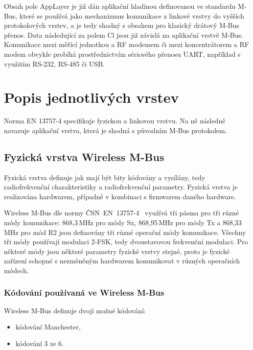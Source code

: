Obsah pole AppLayer je již dán aplikační hladinou definovanou ve standardu M-Bus, které se používá jako mechanizmus komunikace z linkové vrstvy do vyšších protokolových vrstev, a je tedy shodný s obsahem pro klasický drátový M-Bus přenos.  Data následující za polem Cl jsou již závislá na aplikační vrstvě M-Bus. Komunikace mezi měřící jednotkou a RF modemem či mezi koncentrátorem a RF modem obvykle probíhá prostřednictvím sériového přenosu UART, například s využitím RS-232, RS-485 či USB.





\section{Popis jednotlivých vrstev}

Norma EN 13757-4 specifikuje fyzickou a linkovou vrstvu. Na ně následně navazuje aplikační vrstva, která je shodná s původním M-Bus protokolem.

\subsection{Fyzická vrstva Wireless M-Bus}
Fyzická vrstva definuje jak mají být bity kódovány a vysílány, tedy radiofrekvenční charakteristiky a radiofrekvenční parametry. Fyzická vrstva je realizována hardwarem, případně v kombinaci s firmwarem daného hardware.

Wireless M-Bus dle normy ČSN~EN~13757-4~\cite{Norma4} využívá tři pásma pro tři různé módy komunikace: 868,3\,MHz pro módy Sx, 868,95\,MHz pro módy Tx a 868,33\,MHz pro mód R2 jsou definovány tři různé operační módy komunikace. Všechny tři módy používají modulaci 2-FSK, tedy dvoustavovou frekvenční modulaci. Pro některé módy jsou některé parametry fyzické vrstvy stejné, proto je fyzické zařízení schopné s nezměněným hardwarem komunikovat v různých operačních módech.


\subsubsection{Kódování používaná ve Wireless M-Bus}
Wireless M-Bus definuje dvojí možné kódování: 
\begin{itemize}
	\item kódování Manchester,
	\item kódování 3 ze 6. 
\end{itemize}

